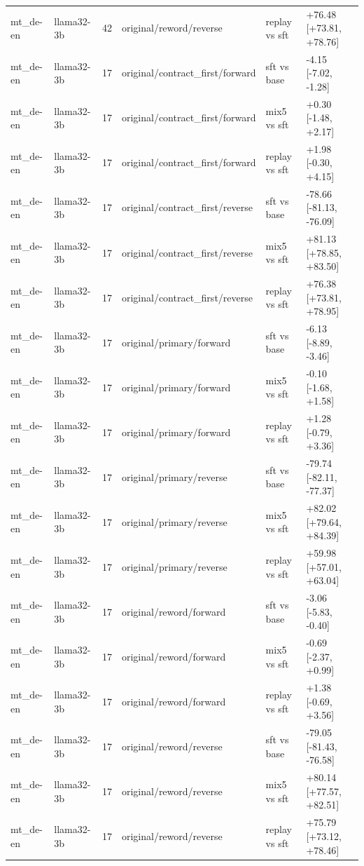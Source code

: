 \begin{table}[t]
\begin{tabular}{llllll}
mt\_de-en & llama32-3b & 42 & original/reword/reverse & replay vs sft & +76.48 [+73.81, +78.76] \\
mt\_de-en & llama32-3b & 17 & original/contract\_first/forward & sft vs base & -4.15 [-7.02, -1.28] \\
mt\_de-en & llama32-3b & 17 & original/contract\_first/forward & mix5 vs sft & +0.30 [-1.48, +2.17] \\
mt\_de-en & llama32-3b & 17 & original/contract\_first/forward & replay vs sft & +1.98 [-0.30, +4.15] \\
mt\_de-en & llama32-3b & 17 & original/contract\_first/reverse & sft vs base & -78.66 [-81.13, -76.09] \\
mt\_de-en & llama32-3b & 17 & original/contract\_first/reverse & mix5 vs sft & +81.13 [+78.85, +83.50] \\
mt\_de-en & llama32-3b & 17 & original/contract\_first/reverse & replay vs sft & +76.38 [+73.81, +78.95] \\
mt\_de-en & llama32-3b & 17 & original/primary/forward & sft vs base & -6.13 [-8.89, -3.46] \\
mt\_de-en & llama32-3b & 17 & original/primary/forward & mix5 vs sft & -0.10 [-1.68, +1.58] \\
mt\_de-en & llama32-3b & 17 & original/primary/forward & replay vs sft & +1.28 [-0.79, +3.36] \\
mt\_de-en & llama32-3b & 17 & original/primary/reverse & sft vs base & -79.74 [-82.11, -77.37] \\
mt\_de-en & llama32-3b & 17 & original/primary/reverse & mix5 vs sft & +82.02 [+79.64, +84.39] \\
mt\_de-en & llama32-3b & 17 & original/primary/reverse & replay vs sft & +59.98 [+57.01, +63.04] \\
mt\_de-en & llama32-3b & 17 & original/reword/forward & sft vs base & -3.06 [-5.83, -0.40] \\
mt\_de-en & llama32-3b & 17 & original/reword/forward & mix5 vs sft & -0.69 [-2.37, +0.99] \\
mt\_de-en & llama32-3b & 17 & original/reword/forward & replay vs sft & +1.38 [-0.69, +3.56] \\
mt\_de-en & llama32-3b & 17 & original/reword/reverse & sft vs base & -79.05 [-81.43, -76.58] \\
mt\_de-en & llama32-3b & 17 & original/reword/reverse & mix5 vs sft & +80.14 [+77.57, +82.51] \\
mt\_de-en & llama32-3b & 17 & original/reword/reverse & replay vs sft & +75.79 [+73.12, +78.46] \\

\end{tabular}
\end{table}
